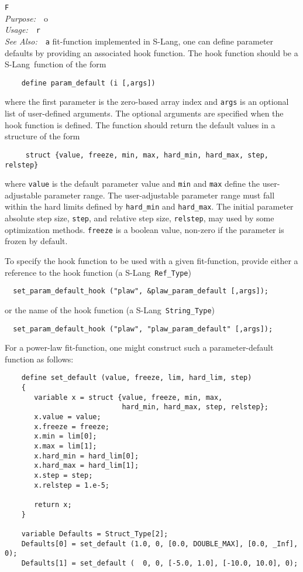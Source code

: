 \documentclass{book}
\makeatletter
\newif\ifpdf
\newcommand{\slang}{{\sc S-Lang}}
\newenvironment{isisfunction}[4]%
{\index{{#1}@{\tt #1}}%
  \ifpdf
  \else
     \addcontentsline{toc}{subsection}{{#1} -- {#2}}
  \fi
  \vbox{
          \vspace*{\baselineskip}
          {\LARGE\tt #1}\vspace*{\baselineskip}\\
          {{\it Purpose:}~~{#2}}\\
          {{\it Usage:}~~{\tt #3}}\\
          {{\it See Also:}~~{\tt #4}}
       }
}%
{ }
\makeatother
\begin{document}
{\begin{isisfunction}
For a fit-function implemented in \slang, one can define parameter defaults by
providing an associated hook function. The hook function should be a \slang\
function of the form
\begin{verbatim}
    define param_default (i [,args])
\end{verbatim}
where the first parameter is the zero-based array index and \verb|args| is an
optional list of user-defined arguments. The optional arguments are specified
when the hook function is defined.  The function should return the default
values in a structure of the form
\begin{verbatim}
     struct {value, freeze, min, max, hard_min, hard_max, step, relstep}
\end{verbatim}
where \verb|value| is the default parameter value and \verb|min| and
\verb|max| define the user-adjustable parameter range.  The user-adjustable
parameter range must fall within the hard limits defined by \verb|hard_min|
and \verb|hard_max|.  The initial parameter absolute step size, \verb|step|,
and relative step size, \verb|relstep|, may used by
some optimization methods. \verb|freeze| is a
boolean value, non-zero if the parameter is frozen by default.

To specify the hook function to be used with a given fit-function,
provide either a reference to the hook function (a \slang\
\verb|Ref_Type|)
\begin{verbatim}
  set_param_default_hook ("plaw", &plaw_param_default [,args]);
\end{verbatim}
or the name of the hook function (a \slang\ \verb|String_Type|)
\begin{verbatim}
  set_param_default_hook ("plaw", "plaw_param_default" [,args]);
\end{verbatim}

For a power-law fit-function, one might construct such a
parameter-default function as follows:
\begin{verbatim}
    define set_default (value, freeze, lim, hard_lim, step)
    {
       variable x = struct {value, freeze, min, max,
                            hard_min, hard_max, step, relstep};
       x.value = value;
       x.freeze = freeze;
       x.min = lim[0];
       x.max = lim[1];
       x.hard_min = hard_lim[0];
       x.hard_max = hard_lim[1];
       x.step = step;
       x.relstep = 1.e-5;

       return x;
    }

    variable Defaults = Struct_Type[2];
    Defaults[0] = set_default (1.0, 0, [0.0, DOUBLE_MAX], [0.0, _Inf], 0);
    Defaults[1] = set_default (  0, 0, [-5.0, 1.0], [-10.0, 10.0], 0);


\end{verbatim}
\end{isisfunction}}
\end{document}
